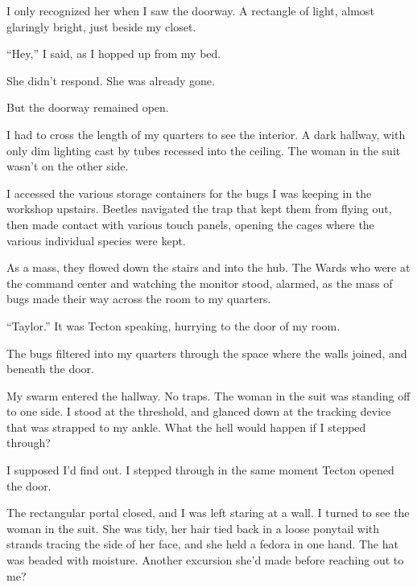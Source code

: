 I only recognized her when I saw the doorway.  A rectangle of light, almost glaringly bright, just beside my closet.



``Hey,'' I said, as I hopped up from my bed.



She didn't respond.  She was already gone.



But the doorway remained open.



I had to cross the length of my quarters to see the interior.  A dark hallway, with only dim lighting cast by tubes recessed into the ceiling.  The woman in the suit wasn't on the other side.



I accessed the various storage containers for the bugs I was keeping in the workshop upstairs.  Beetles navigated the trap that kept them from flying out, then made contact with various touch panels, opening the cages where the various individual species were kept.



As a mass, they flowed down the stairs and into the hub.  The Wards who were at the command center and watching the monitor stood, alarmed, as the mass of bugs made their way across the room to my quarters.



``Taylor.''  It was Tecton speaking, hurrying to the door of my room.



The bugs filtered into my quarters through the space where the walls joined, and beneath the door.



My swarm entered the hallway.  No traps.  The woman in the suit was standing off to one side.  I stood at the threshold, and glanced down at the tracking device that was strapped to my ankle.  What the hell would happen if I stepped through?



I supposed I'd find out.  I stepped through in the same moment Tecton opened the door.



The rectangular portal closed, and I was left staring at a wall.  I turned to see the woman in the suit.  She was tidy, her hair tied back in a loose ponytail with strands tracing the side of her face, and she held a fedora in one hand.  The hat was beaded with moisture.  Another excursion she'd made before reaching out to me?



